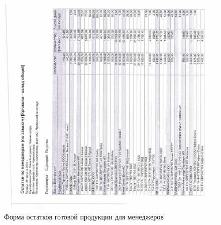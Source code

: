 \begin{figure}
\begin{center}
 \includegraphics[width=\linewidth, height=0.94\textheight, keepaspectratio]{Pics/d14.jpg}
\end{center}
 \caption{Форма остатков готовой продукции для менеджеров}
 \label{pic:d14}
\end{figure}

